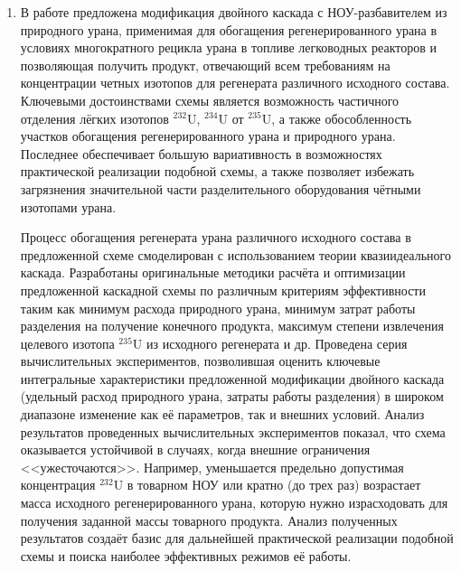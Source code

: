 \begin{enumerate}
\item В работе предложена модификация двойного каскада с НОУ-разбавителем из природного урана, применимая для обогащения регенерированного урана в условиях многократного рецикла урана в топливе легководных реакторов и позволяющая получить продукт, отвечающий всем требованиям на концентрации четных изотопов для регенерата различного исходного состава. Ключевыми достоинствами схемы является возможность частичного отделения лёгких изотопов $^{232}$U, $^{234}$U от $^{235}$U, а также обособленность участков обогащения регенерированного урана и природного урана. Последнее обеспечивает большую вариативность в возможностях практической реализации подобной схемы, а также позволяет избежать загрязнения значительной части разделительного оборудования чётными изотопами урана.


Процесс обогащения регенерата урана различного исходного состава в предложенной схеме смоделирован с использованием теории квазиидеального каскада. Разработаны оригинальные методики расчёта и оптимизации предложенной каскадной схемы по различным критериям эффективности таким как минимум расхода природного урана, минимум затрат работы разделения на получение конечного продукта, максимум степени извлечения целевого изотопа $^{235}$U из исходного регенерата и др. Проведена серия вычислительных экспериментов, позволившая оценить ключевые интегральные характеристики предложенной модификации двойного каскада (удельный расход природного урана, затраты работы разделения) в широком диапазоне изменение как её параметров, так и внешних условий. Анализ результатов проведенных вычислительных экспериментов показал, что схема оказывается устойчивой в случаях, когда внешние ограничения <<ужесточаются>>. Например, уменьшается предельно допустимая концентрация $^{232}$U в товарном НОУ или кратно (до трех раз) возрастает масса исходного регенерированного урана, которую нужно израсходовать для получения заданной массы товарного продукта. Анализ полученных результатов создаёт базис для дальнейшей практической реализации подобной схемы и поиска наиболее эффективных режимов её работы.


\end{enumerate}
